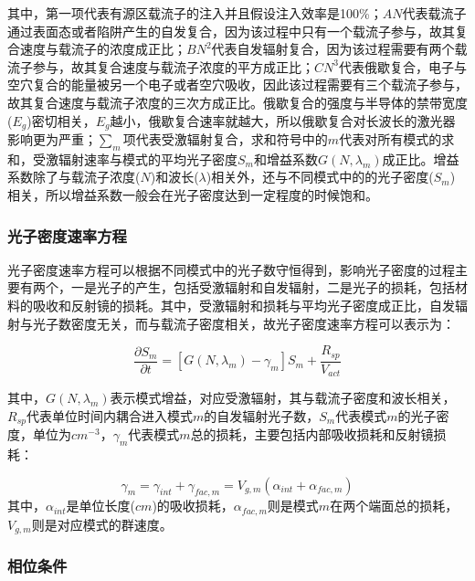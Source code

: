 其中，第一项代表有源区载流子的注入并且假设注入效率是100\%；$AN$代表载流子通过表面态或者陷阱产生的自发复合，因为该过程中只有一个载流子参与，故其复合速度与载流子的浓度成正比\cite{shockley1952statistics}；$BN^{2}$代表自发辐射复合，因为该过程需要有两个载流子参与，故其复合速度与载流子浓度的平方成正比\cite{olshansky1984measurement}；$CN^{3}$代表俄歇复合，电子与空穴复合的能量被另一个电子或者空穴吸收，因此该过程需要有三个载流子参与，故其复合速度与载流子浓度的三次方成正比\cite{agrawal1986long}。俄歇复合的强度与半导体的禁带宽度($E_{g}$)密切相关，$E_{g}$越小，俄歇复合速率就越大，所以俄歇复合对长波长的激光器影响更为严重\cite{dexiu1999}；$\sum_{m}$项代表受激辐射复合，求和符号中的$m$代表对所有模式的求和，受激辐射速率与模式的平均光子密度$S_{m}$和增益系数$G(N,\lambda_{m})$成正比。增益系数除了与载流子浓度($N$)和波长($\lambda$)相关外，还与不同模式中的的光子密度($S_{m}$)相关，所以增益系数一般会在光子密度达到一定程度的时候饱和。

\subsubsection{光子密度速率方程}
光子密度速率方程可以根据不同模式中的光子数守恒得到，影响光子密度的过程主要有两个，一是光子的产生，包括受激辐射和自发辐射，二是光子的损耗，包括材料的吸收和反射镜的损耗。其中，受激辐射和损耗与平均光子密度成正比，自发辐射与光子数密度无关，而与载流子密度相关，故光子密度速率方程可以表示为\cite{petermann2012laser}：

\begin{equation}
\label{photon_density_rate_equation}
\dfrac{\partial S_{m}}{\partial t} = [G(N,\lambda_{m})-\gamma_{m}]S_{m}+\dfrac{R_{sp}}{V_{act}}
\end{equation}

其中，$G(N,\lambda_{m})$表示模式增益，对应受激辐射，其与载流子密度和波长相关，$R_{sp}$代表单位时间内耦合进入模式$m$的自发辐射光子数，$S_{m}$代表模式$m$的光子密度，单位为$cm^{-3}$，$\gamma_{m}$代表模式$m$总的损耗，主要包括内部吸收损耗和反射镜损耗：

\begin{equation}
\label{photon_loss}
\gamma_{m} = \gamma_{int}+\gamma_{fac,m} = V_{g,m}(\alpha_{int}+\alpha_{fac,m})
\end{equation}
其中，$\alpha_{int}$是单位长度($cm$)的吸收损耗，$\alpha_{fac,m}$则是模式$m$在两个端面总的损耗，$V_{g,m}$则是对应模式的群速度。

\subsubsection{相位条件}

